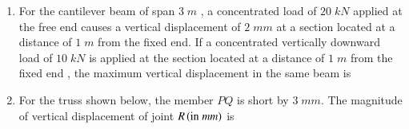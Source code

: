 \documentclass[journal,12pt,onecolumn]{IEEEtran}
\theoremstyle{remark}
\begin{document}
\begin{enumerate}[start=27]
\begin{enumerate}
\end{enumerate}
\item For the cantilever beam of span $3\;m$ , a concentrated load of $20\;kN$ applied at the free end causes a vertical displacement of $2\;mm$ at a section located at a distance of $1\;m$ from the fixed end. If a concentrated vertically downward load of $10\; kN$ is applied at the section located at a distance of $1\;m$ from the fixed end , the maximum vertical displacement in the same beam  is \underline{\hspace{2cm}}
	
\item For the truss shown below, the member $PQ$ is short by $3\;mm$. The magnitude of vertical displacement of joint $R\left(\text{in} \;mm\right)$ is \underline{\hspace{2cm}}\\
	



\end{enumerate}
\end{document}
